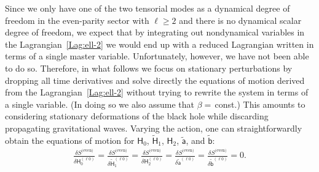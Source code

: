 \documentclass[aps,prd,preprintnumbers,superscriptaddress,nofootinbib,notitlepage]{revtex4-2}
\begin{document}
Since we only have one of the two tensorial modes as a dynamical degree of freedom in the even-parity sector with $\ell\ge 2$ and there is no dynamical scalar degree of freedom, we expect that by integrating out nondynamical variables in the Lagrangian~\eqref{Lag:ell-2} we would end up with a reduced Lagrangian written in terms of a single master variable.
Unfortunately, however, we have not been able to do so.
Therefore, in what follows we focus on stationary perturbations by dropping all time derivatives and solve directly the equations of motion derived from the Lagrangian~\eqref{Lag:ell-2} without trying to rewrite the system in terms of a single variable.
(In doing so we also assume that $\beta=\,$const.)
This amounts to considering stationary deformations of the black hole while discarding propagating gravitational waves.
Varying the action, one can straightforwardly obtain the equations of motion for $\mathsf{H}_0$, $\widetilde{\mathsf{H}}_1$, $\mathsf{H}_2$, $\widetilde{\mathsf{a}}$, and $\widetilde{\mathsf{b}}$:
\begin{align}
    \frac{\delta S^{\textrm{(even)}}}{\delta \mathsf{H}_0^{(\ell 0)}}=
    \frac{\delta S^{\textrm{(even)}}}{\delta \widetilde{\mathsf{H}}_1^{(\ell 0)}}=
    \frac{\delta S^{\textrm{(even)}}}{\delta \mathsf{H}_2^{(\ell 0)}}=
    \frac{\delta S^{\textrm{(even)}}}{\delta \widetilde{\mathsf{a}}^{(\ell 0)}}=
    \frac{\delta S^{\textrm{(even)}}}{\delta \widetilde{\mathsf{b}}^{(\ell 0)}}=0.
    \label{eq:l=2_even}
\end{align}
\end{document}
